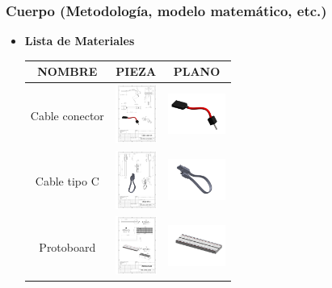     \subsubsection{ Cuerpo (Metodología, modelo matemático, etc.)}
    \begin{itemize}
    \item \textbf{Lista de Materiales}  
    \begin{table} [H]
          
      \huge
      \tiny 
      \begin{tabular}   {| c |  c |  c | }
      
      \hline
      NOMBRE & PIEZA  & PLANO \\
      \hline 
      Cable conector &  \includegraphics[height=19mm]{1/img/cable conetor.pdf}  & 
       \includegraphics[width=19mm]{1/img/cable conetor_1.pdf} \\
        \hline
        Cable tipo C &  \includegraphics[height=19mm]{1/img/Cable tipo C.pdf}  & 
       \includegraphics[width=19mm]{1/img/Cable tipo C_1.pdf} \\
        \hline
      Protoboard &  \includegraphics[height=19mm]{1/img/Protoboard.pdf}  & 
       \includegraphics[width=19mm]{1/img/Protoboard_1.pdf} \\

\end{tabular}
\end{table}
\end{itemize}
